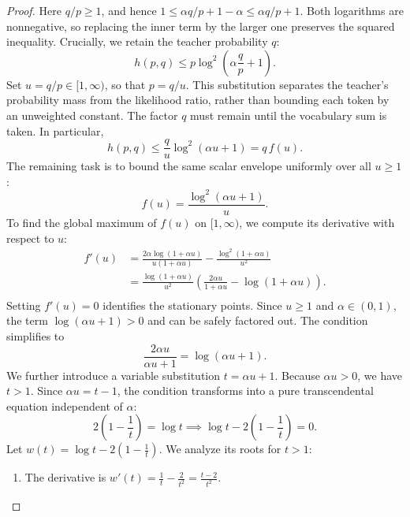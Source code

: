 \documentclass{article}
\theoremstyle{plain}
\theoremstyle{definition}
\theoremstyle{remark}
\begin{document}
\begin{proof}
	Here $q/p\geq1$, and hence $1\leq\alpha q/p+1-\alpha\leq\alpha q/p+1$. Both logarithms are nonnegative, so replacing the inner term by the larger one preserves the squared inequality. Crucially, we retain the teacher probability $q$:
	\begin{equation}
		h(p,q)\leq p\log^2\left(\alpha\frac{q}{p}+1\right).
	\end{equation}
	Set $u=q/p\in[1,\infty)$, so that $p=q/u$. This substitution separates the teacher's probability mass from the likelihood ratio, rather than bounding each token by an unweighted constant. The factor $q$ must remain until the vocabulary sum is taken. In particular,
	\begin{equation}
		h(p,q)\leq\frac{q}{u}\log^2(\alpha u+1)=q\,f(u).
	\end{equation}
	The remaining task is to bound the same scalar envelope uniformly over all $u\geq1$:
	\begin{equation}
		f(u) = \frac{\log^2(\alpha u + 1)}{u}.
	\end{equation}
	To find the global maximum of $f(u)$ on $[1,\infty)$, we compute its derivative with respect to $u$:
	\begin{equation}
		\begin{split}
			f'(u)&=\frac{2\alpha\log(1+\alpha u)}{u(1+\alpha u)}-\frac{\log^2(1+\alpha u)}{u^2}\\
			&=\frac{\log(1+\alpha u)}{u^2}\left(\frac{2\alpha u}{1+\alpha u}-\log(1+\alpha u)\right).\\
		\end{split}
	\end{equation}
	Setting $f'(u) = 0$ identifies the stationary points. Since $u \geq 1$ and $\alpha \in (0, 1)$, the term $\log(\alpha u + 1) > 0$ and can be safely factored out. The condition simplifies to
	\begin{equation}
		\frac{2\alpha u}{\alpha u + 1} = \log(\alpha u + 1).
	\end{equation}
	We further introduce a variable substitution $t = \alpha u + 1$. Because $\alpha u > 0$, we have $t > 1$. Since $\alpha u = t - 1$, the condition transforms into a pure transcendental equation independent of $\alpha$:
	\begin{equation}
		2\left(1-\frac{1}{t}\right) = \log t \implies \log t - 2\left(1 - \frac{1}{t}\right) = 0.
	\end{equation}
	Let $w(t) = \log t - 2\left(1 - \frac{1}{t}\right)$. We analyze its roots for $t > 1$:
	\begin{enumerate}
		\item The derivative is $w'(t) = \frac{1}{t} - \frac{2}{t^2} = \frac{t - 2}{t^2}$.

\end{enumerate}
\end{proof}
\end{document}
